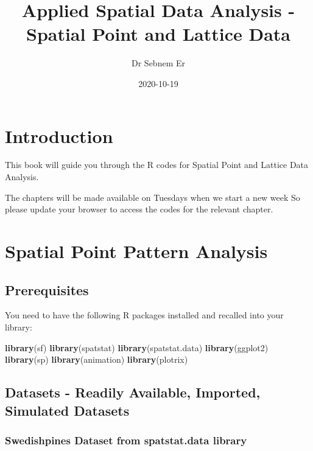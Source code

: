 \documentclass[
]{book}
\title{Applied Spatial Data Analysis - Spatial Point and Lattice Data}
\author{Dr Sebnem Er}
\date{2020-10-19}
\newenvironment{Shaded}{\begin{snugshade}}{\end{snugshade}}
\newcommand{\KeywordTok}[1]{\textcolor[rgb]{0.13,0.29,0.53}{\textbf{#1}}}
\newcommand{\NormalTok}[1]{#1}
\begin{document}
\maketitle

{
\setcounter{tocdepth}{1}
\tableofcontents
}
\hypertarget{introduction}{%
\chapter{Introduction}\label{introduction}}

This book will guide you through the R codes for Spatial Point and Lattice Data Analysis.

The chapters will be made available on Tuesdays when we start a new week So please update your browser to access the codes for the relevant chapter.

\hypertarget{spatial-point-pattern-analysis}{%
\chapter{Spatial Point Pattern Analysis}\label{spatial-point-pattern-analysis}}

\hypertarget{prerequisites}{%
\section{Prerequisites}\label{prerequisites}}

You need to have the following R packages installed and recalled into your library:

\begin{Shaded}
\begin{Highlighting}[]
\KeywordTok{library}\NormalTok{(sf)}
\KeywordTok{library}\NormalTok{(spatstat)}
\KeywordTok{library}\NormalTok{(spatstat.data)}
\KeywordTok{library}\NormalTok{(ggplot2)}
\KeywordTok{library}\NormalTok{(sp)}
\KeywordTok{library}\NormalTok{(animation)}
\KeywordTok{library}\NormalTok{(plotrix)}
\end{Highlighting}
\end{Shaded}

\hypertarget{datasets---readily-available-imported-simulated-datasets}{%
\section{Datasets - Readily Available, Imported, Simulated Datasets}\label{datasets---readily-available-imported-simulated-datasets}}

\hypertarget{swedishpines-dataset-from-spatstat.data-library}{%
\subsection{Swedishpines Dataset from spatstat.data library}\label{swedishpines-dataset-from-spatstat.data-library}}
\end{document}
